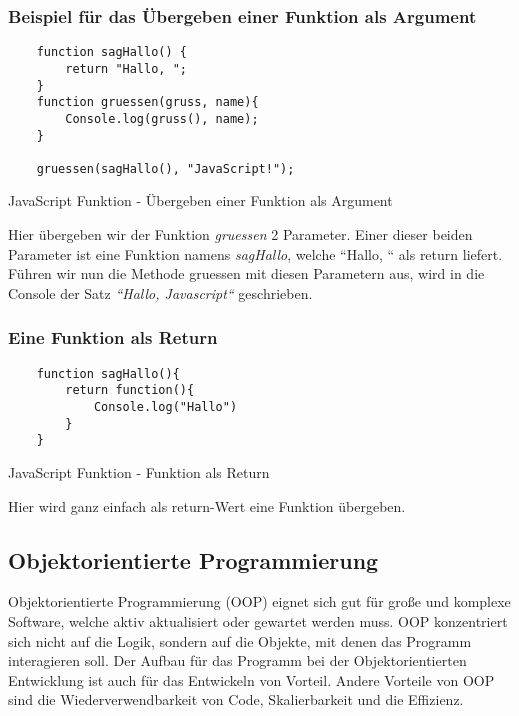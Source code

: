 \subsubsection{Beispiel für das Übergeben einer Funktion als Argument}
\begin{code}[htp]
\begin{lstlisting}
    function sagHallo() {
        return "Hallo, ";
    }
    function gruessen(gruss, name){
        Console.log(gruss(), name);
    }

    gruessen(sagHallo(), "JavaScript!");
\end{lstlisting}
\caption{JavaScript Funktion - Übergeben einer Funktion als Argument}
\end{code}
Hier übergeben wir der Funktion \textit{gruessen} 2 Parameter. Einer dieser beiden Parameter ist eine
Funktion namens \textit{sagHallo}, welche ``Hallo, `` als return liefert. Führen wir nun 
die Methode gruessen mit diesen Parametern aus, wird in die Console der Satz 
\textit{``Hallo, Javascript``} geschrieben.

\subsubsection{Eine Funktion als Return}
\begin{code}[htp]
\begin{lstlisting}
    function sagHallo(){
        return function(){
            Console.log("Hallo")
        }
    }
\end{lstlisting}
\caption{JavaScript Funktion - Funktion als Return}
\end{code}
Hier wird ganz einfach als return-Wert eine Funktion übergeben.

\subsection{Objektorientierte Programmierung}
Objektorientierte Programmierung (OOP) eignet sich gut für große und komplexe Software, welche aktiv 
aktualisiert oder gewartet werden muss. OOP konzentriert sich nicht auf die Logik, sondern auf die 
Objekte, mit denen das Programm interagieren soll. Der Aufbau für das Programm bei der 
Objektorientierten Entwicklung ist auch für das Entwickeln von Vorteil. Andere Vorteile von OOP 
sind die Wiederverwendbarkeit von Code, Skalierbarkeit und die Effizienz.~\cite{OOP}

\newpage
